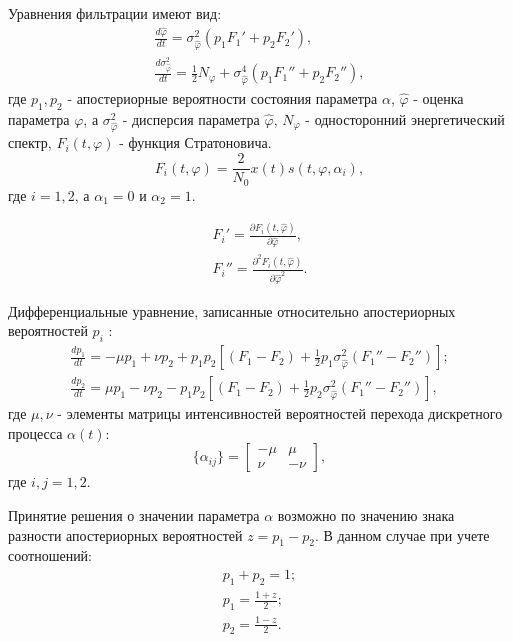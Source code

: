 Уравнения фильтрации имеют вид:
\begin{eqnarray}
	\frac{d \hat{\varphi}}{dt} = \sigma_{\hat{\varphi}}^2(p_1 F_{1}' + p_2 F_{2}'), \nonumber \\
	\frac{d \sigma_{\hat{\varphi}}^2}{dt} = \frac{1}{2}N_{\varphi} + \sigma_{\hat{\varphi}}^4(p_1 F_{1}'' + p_2 F_{2}''),
	\label{eq:sec4_filter_eq}
\end{eqnarray}
где ${p_1, p_2}$ - апостериорные вероятности состояния параметра ${\alpha}$, ${\hat{\varphi}}$ - оценка параметра ${\varphi}$, а ${\sigma_{\hat{\varphi}}^2}$ - 
дисперсия параметра ${\hat{\varphi}}$, ${N_{\varphi}}$ - односторонний энергетический спектр, ${F_i(t, \varphi)}$ - функция Стратоновича.
\begin{equation}
	F_i(t, \varphi) = \frac{2}{N_0} x(t)s(t, \varphi, \alpha_i),
	\label{eq:sec4_stratonovicha_eq}
\end{equation}
где ${i = 1, 2}$, а ${\alpha_1 = 0}$ и ${\alpha_2 = 1}$.

\begin{eqnarray}
	F_{i}' = \frac{\partial{F_i (t, \hat{\varphi})}}{\partial{\hat{\varphi}}}, \nonumber \\
	F_{i}'' = \frac{\partial^2{F_i (t, \hat{\varphi})}}{\partial{\hat{\varphi}^2}}.
	\label{eq:sec4_stratonovicha_eq_der}
\end{eqnarray}

Дифференциальные уравнение, записанные относительно  апостериорных вероятностей ${p_i}$ \cite{shahtarin-wiener-kalman}:
\begin{eqnarray}
	\frac{dp_1}{dt} = -\mu p_1 + \nu p_2 + p_1 p_2 \left[ (F_1 - F_2) + \frac{1}{2} p_1 \sigma_{\hat{\varphi}}^2 (F_1'' - F_2'') \right]; \nonumber \\
	\frac{dp_2}{dt} = \mu p_1 - \nu p_2 - p_1 p_2 \left[ (F_1 - F_2) + \frac{1}{2} p_2 \sigma_{\hat{\varphi}}^2 (F_1'' - F_2'') \right],
	\label{eq:sec4_stratonovicha_eq_der_p}
\end{eqnarray}
где ${\mu, \nu}$ - элементы матрицы интенсивностей вероятностей перехода дискретного процесса ${\alpha(t)}$:
\begin{equation}
	\label{eq:sec4_alpha}
	\{\alpha_{ij}\}
	=
		\left[ \begin{array}{cc}
			-\mu	&	\mu \\
			\nu 	&	-\nu
		\end{array} \right],
\end{equation}
где ${i,j = 1,2}$.

Принятие решения о значении параметра ${\alpha}$ возможно по значению знака разности апостериорных вероятностей ${z = p_1 - p_2}$. В данном случае
при учете соотношений:
\begin{eqnarray}
	p_1 + p_2 = 1; \nonumber \\
	p_1 = \frac{1+z}{2}; \nonumber \\
	p_2 = \frac{1-z}{2}.
	\label{eq:sec4_probability}
\end{eqnarray}


